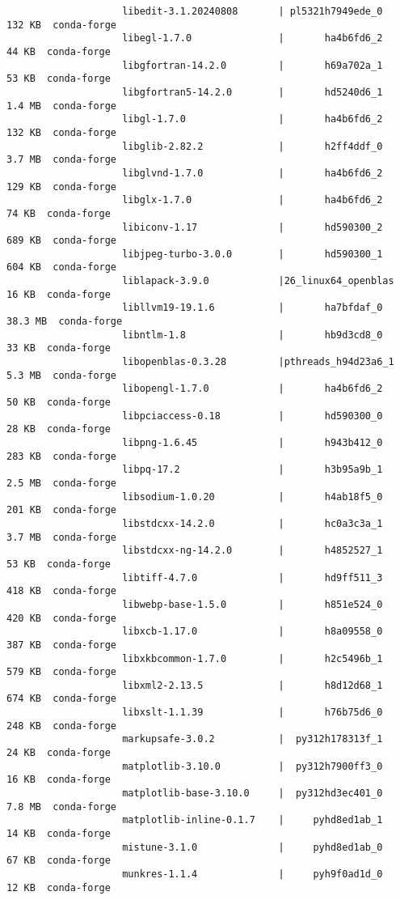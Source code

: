 \documentclass{article}
\begin{document}
\begin{enumerate}
\begin{itemize}
\begin{itemize}
\begin{itemize}
\begin{verbatim}
					libedit-3.1.20240808       | pl5321h7949ede_0         132 KB  conda-forge
					libegl-1.7.0               |       ha4b6fd6_2          44 KB  conda-forge
					libgfortran-14.2.0         |       h69a702a_1          53 KB  conda-forge
					libgfortran5-14.2.0        |       hd5240d6_1         1.4 MB  conda-forge
					libgl-1.7.0                |       ha4b6fd6_2         132 KB  conda-forge
					libglib-2.82.2             |       h2ff4ddf_0         3.7 MB  conda-forge
					libglvnd-1.7.0             |       ha4b6fd6_2         129 KB  conda-forge
					libglx-1.7.0               |       ha4b6fd6_2          74 KB  conda-forge
					libiconv-1.17              |       hd590300_2         689 KB  conda-forge
					libjpeg-turbo-3.0.0        |       hd590300_1         604 KB  conda-forge
					liblapack-3.9.0            |26_linux64_openblas          16 KB  conda-forge
					libllvm19-19.1.6           |       ha7bfdaf_0        38.3 MB  conda-forge
					libntlm-1.8                |       hb9d3cd8_0          33 KB  conda-forge
					libopenblas-0.3.28         |pthreads_h94d23a6_1         5.3 MB  conda-forge
					libopengl-1.7.0            |       ha4b6fd6_2          50 KB  conda-forge
					libpciaccess-0.18          |       hd590300_0          28 KB  conda-forge
					libpng-1.6.45              |       h943b412_0         283 KB  conda-forge
					libpq-17.2                 |       h3b95a9b_1         2.5 MB  conda-forge
					libsodium-1.0.20           |       h4ab18f5_0         201 KB  conda-forge
					libstdcxx-14.2.0           |       hc0a3c3a_1         3.7 MB  conda-forge
					libstdcxx-ng-14.2.0        |       h4852527_1          53 KB  conda-forge
					libtiff-4.7.0              |       hd9ff511_3         418 KB  conda-forge
					libwebp-base-1.5.0         |       h851e524_0         420 KB  conda-forge
					libxcb-1.17.0              |       h8a09558_0         387 KB  conda-forge
					libxkbcommon-1.7.0         |       h2c5496b_1         579 KB  conda-forge
					libxml2-2.13.5             |       h8d12d68_1         674 KB  conda-forge
					libxslt-1.1.39             |       h76b75d6_0         248 KB  conda-forge
					markupsafe-3.0.2           |  py312h178313f_1          24 KB  conda-forge
					matplotlib-3.10.0          |  py312h7900ff3_0          16 KB  conda-forge
					matplotlib-base-3.10.0     |  py312hd3ec401_0         7.8 MB  conda-forge
					matplotlib-inline-0.1.7    |     pyhd8ed1ab_1          14 KB  conda-forge
					mistune-3.1.0              |     pyhd8ed1ab_0          67 KB  conda-forge
					munkres-1.1.4              |     pyh9f0ad1d_0          12 KB  conda-forge

\end{verbatim}
\end{itemize}
\end{itemize}
\end{itemize}
\end{enumerate}
\end{document}

